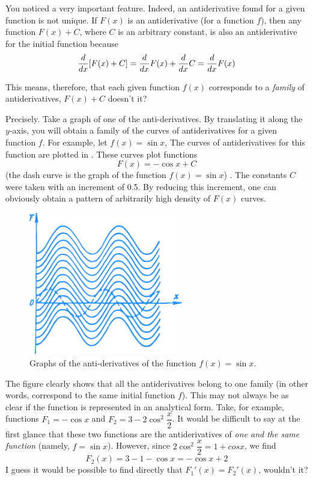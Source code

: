 \athr You noticed a very important feature. Indeed, an antiderivative found for a given function is not unique. If $F (x)$ is an antiderivative (for a function $f$), then any function $F (x) + C$, where $C$ is an arbitrary constant, is also an antiderivative for the initial function because
\begin{equation*}%
\ddx [F(x)+C]= \ddx F(x) + \ddx C= \ddx F(x)
\end{equation*}

\rdr This means, therefore, that each given function $f (x)$ corresponds to a \emph{family} of antiderivatives, $F (x) +C$ doesn't it?

\athr Precisely. Take a graph of one of the anti-derivatives. By translating it along the $y$-axis, you will obtain a family of the curves of antiderivatives for a given function $f$. For example, let $f (x) = \sin x$, The curves of
antiderivatives for this function are plotted in . These curves plot functions
\begin{equation*}%
F (x) = - \cos x + C
\end{equation*}
(the dash curve is the graph of the function $f (x) = \sin x$) . The constants $C$ were taken with an increment of 0.5. By reducing this increment, one can obviously obtain a pattern of arbitrarily high density of $F (x)$ curves.

\begin{figure}[!ht]%
\centering
\includegraphics[width=0.6\textwidth]{figures/fig-44.pdf}
\caption{Graphs of the anti-derivatives of the function $f (x) = \sin x$.}
\label{fig-44}
\end{figure}

The figure clearly shows that all the antiderivatives belong to one family (in other words, correspond to the same initial function $f$). This may not always be as clear if the function is represented in an analytical form. Take, for
example, functions $F_{1} =-\cos x$ and $F_{2} =3- 2	\cos^{2} \dfrac{x}{2}$. It would be difficult to say at the first glance that these two
functions are the antiderivatives of \emph{one and the same function} (namely, $f = \sin x$). However, since $2 \cos^{2} \dfrac{x}{2} = 1 + cos x$, we find
\begin{equation*}%
F_{2}(x) = 3- 1 - \cos x =- \cos x + 2
\end{equation*}
\rdr I guess it would be possible to find directly that $F_{1}' (x) = F_{2}' (x)$, wouldn't it?

